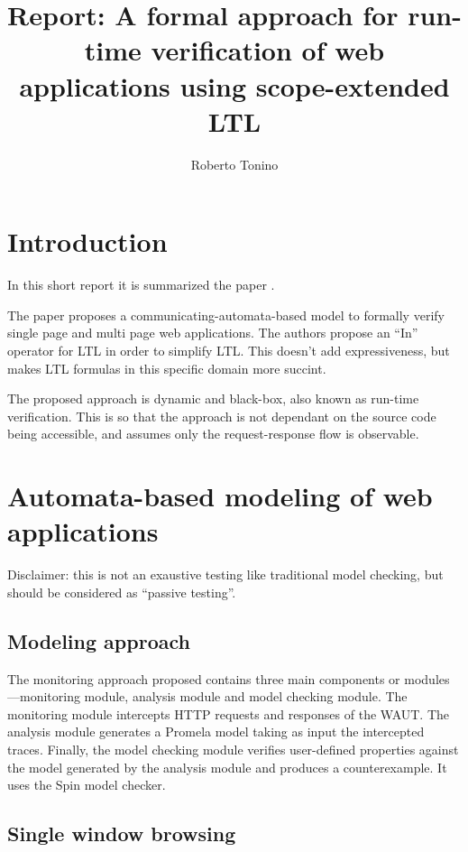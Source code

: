 \documentclass[a4paper,11pt]{article}
\title{Report: A formal approach for run-time verification of web applications using scope-extended LTL}
\author{Roberto Tonino}
\begin{document}
\maketitle
\tableofcontents

\section{Introduction}
\label{introduction}

In this short report it is summarized the paper .

The paper proposes a communicating-automata-based model to formally
verify single page and multi page web applications. The authors
propose an ``In'' operator for LTL in order to simplify LTL. This
doesn't add expressiveness, but makes LTL formulas in this specific
domain more succint.

The proposed approach is dynamic and black-box, also known as run-time
verification. This is so that the approach is not dependant on the
source code being accessible, and assumes only the request-response flow
is observable.

\section{Automata-based modeling of web applications}
\label{automata-based-modeling-of-web-applications}

Disclaimer: this is not an exaustive testing like traditional model
checking, but should be considered as ``passive testing''.

\subsection{Modeling approach}
\label{modeling-approach}

The monitoring approach proposed contains three main components or modules---monitoring module, analysis module and model checking module. The monitoring module intercepts HTTP requests and responses of the WAUT. The analysis module generates a Promela model taking as input the intercepted traces. Finally, the model checking module verifies user-defined properties against the model generated by the analysis module and produces a counterexample. It uses the Spin model checker.

\subsection{Single window browsing}
\label{single-window-browsing}
\end{document}
